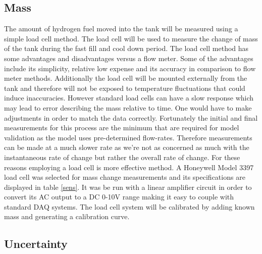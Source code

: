 \documentclass[paper=a4, fontsize=11pt, abstract=on]{scrartcl}
\numberwithin{equation}{section}		%
\numberwithin{figure}{section}			%
\numberwithin{table}{section}				%
\begin{document}
\subsection{Mass}
The amount of hydrogen fuel moved into the tank will be measured using a simple load cell method. The load cell will be used to measure the change of mass of the tank during the fast fill and cool down period. The load cell method has some advantages and disadvantages versus a flow meter. Some of the advantages include its simplicity, relative low expense and its accuracy in comparison to flow meter methods. Additionally the load cell will be mounted externally from the tank and therefore will not be exposed to temperature fluctuations that could induce inaccuracies. However standard load cells can have a slow response which may lead to error describing the mass relative to time. One would have to make adjustments in order to match the data correctly. Fortunately the initial and final measurements for this process are the minimum that are required for model validation as the model uses pre-determined flow-rates.  Therefore measurements can be made at a much slower rate as we're not as concerned as much with the instantaneous rate of change but rather the overall rate of change. For these reasons employing a load cell is more effective method. A Honeywell Model 3397 load cell was selected for mass change measurements and its specifications are displayed in table \ref{sens}. It was be run with a linear amplifier circuit in order to convert its AC output to a DC 0-10V range making it easy to couple with standard DAQ systems. The load cell system will be calibrated by adding known mass and generating a calibration curve.
\subsection{Uncertainty}
\end{document}
